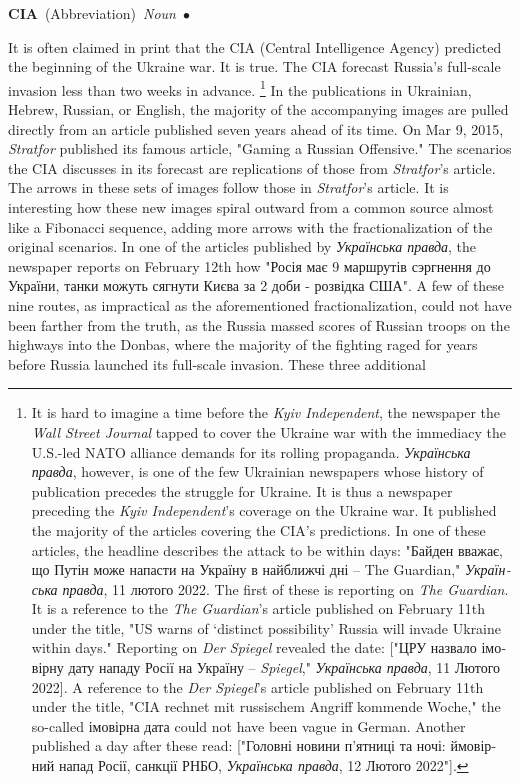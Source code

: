 \documentclass[10pt,a4paper,twoside]{article} %
\newcommand{\entry}[4]{\markboth{#1}{#1}\textbf{#1}\ {(#2)}\ \textit{#3}\ $\bullet$\ {#4}}  %
\begin{document}
\begin{multicols}{2}

\entry{CIA} {Abbreviation} {Noun} {

It is often claimed in print that the CIA (Central Intelligence Agency) predicted the beginning of the Ukraine war. It is true. The CIA forecast Russia's full-scale invasion less than two weeks in advance. \footnote{ It is hard to imagine a time before the \emph{Kyiv Independent}, the newspaper the \emph{Wall Street Journal} tapped to cover the Ukraine war with the immediacy the U.S.-led NATO alliance demands for its rolling propaganda. \textukrainian{\emph{Українська правда}}, however, is one of the few Ukrainian newspapers whose history of publication precedes the struggle for Ukraine. It is thus a newspaper preceding the \emph{Kyiv Independent}'s coverage on the Ukraine war. It published the majority of the articles covering the CIA's predictions. In one of these articles, the headline describes the attack to be within days: \textukrainian{"Байден вважає, що Путін може напасти на Україну в найближчі дні} – The Guardian," \textukrainian{\emph{Українська правда}}, 11 \textukrainian{лютого} 2022. The first of these is reporting on \emph{The Guardian}. It is a reference to the \emph{The Guardian}'s article published on February 11th under the title, "US warns of ‘distinct possibility’ Russia will invade Ukraine within days." Reporting on \emph{Der Spiegel} revealed the date: ["\textukrainian{ЦРУ назвало імовірну дату нападу Росії на Україну} – \emph{Spiegel}," \textukrainian{\emph{Українська правда}}, 11 \textukrainian{Лютого} 2022]. A reference to the \emph{Der Spiegel}'s article published on February 11th under the title, "CIA rechnet mit russischem Angriff kommende Woche," the so-called \textukrainian{імовірна дата} could not have been vague in German. Another published a day after these read: ["\textukrainian{Головні новини п’ятниці та ночі: ймовірний напад Росії, санкції РНБО}, \textukrainian{\emph{Українська правда}}, 12 \textukrainian{Лютого} 2022"].} In the publications in Ukrainian, Hebrew, Russian, or English, the majority of the accompanying images are pulled directly from an article published seven years ahead of its time. On Mar 9, 2015, \emph{Stratfor} published its famous article, "Gaming a Russian Offensive." The scenarios the CIA discusses in its forecast are replications of those from \emph{Stratfor}'s article. The arrows in these sets of images follow those in \emph{Stratfor}'s article.  \newline \indent It is interesting how these new images spiral outward from a common source almost like a Fibonacci sequence, adding more arrows with the fractionalization of the original scenarios.  In one of the articles published by \textukrainian{\emph{Українська правда}}, the newspaper reports on February 12th how \textukrainian{"Росія має 9 маршрутів сэргнення до України, танки можуть сягнути Києва за 2 доби - розвідка США"}. A few of these nine routes, as impractical as the aforementioned fractionalization, could not have been farther from the truth, as the Russia massed scores of Russian troops on the highways into the Donbas, where the majority of the fighting raged for years before Russia launched its full-scale invasion. These three additional }
\end{multicols}
\end{document}
